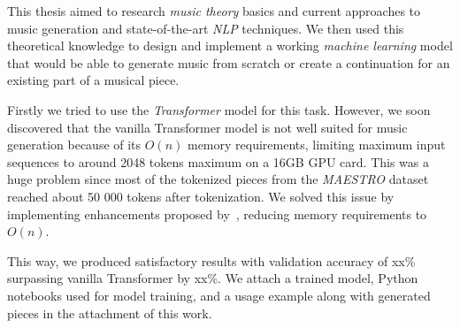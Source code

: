 

This thesis aimed to research \textit{music theory} basics and current approaches to music generation and state-of-the-art \textit{NLP} techniques.
We then used this theoretical knowledge to design and implement a working \textit{machine learning} model that would be able to generate music from scratch or create a continuation for an existing part of a musical piece.

Firstly we tried to use the \textit{Transformer}\cite{attention-is-all-you-need} model for this task.
However, we soon discovered that the vanilla Transformer model is not well suited for music generation because of its $O(n)$ memory requirements, limiting maximum input sequences to around 2048 tokens maximum on a 16GB GPU card.
This was a huge problem since most of the tokenized pieces from the \textit{MAESTRO} dataset reached about 50 000 tokens after tokenization.
We solved this issue by implementing enhancements proposed by~\cite{efficient-transformers}, reducing memory requirements to $O(n)$.

This way, we produced satisfactory results with validation accuracy of xx\% surpassing vanilla Transformer by xx\%.
We attach a trained model, Python notebooks used for model training, and a usage example along with generated pieces in the attachment of this work.
